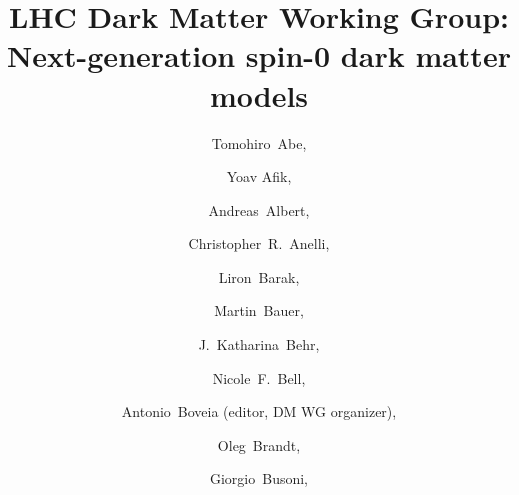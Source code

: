 \documentclass[review]{elsarticle}
\begin{document}
\title{LHC Dark Matter Working Group: Next-generation spin-0 dark matter models}


\author[1,2]{Tomohiro~Abe,}
\address[1]{Institute for Advanced Research, Nagoya University, \\
Furo-cho Chikusa-ku, Nagoya, Aichi, 464-8602, Japan}
\address[2]{Kobayashi-Maskawa Institute for the Origin of Particles and the Universe, \\
 Nagoya University, Furo-cho Chikusa-ku, Nagoya, Aichi, 464-8602, Japan}

\author[3]{Yoav Afik,} 
\address[3]{Department of Physics, Technion: Israel Institute of Technology, Haifa, Israel}

\author[4]{Andreas~Albert,}
\address[4]{III. Physikalisches Institut A, RWTH Aachen University, \\
Physikzentrum, Otto-Blumenthal-Stra{\ss}e, Aachen, Germany}

\author[5]{Christopher~R.~Anelli,}
\address[5]{University of Victoria, Department of Physics and Astronomy, \\ 
Elliott Building, room 101, University of Victoria, Victoria, Canada}

\author[6]{Liron~Barak,}
\address[6]{Tel Aviv University, Haim Levanon (Ramat Aviv), Tel Aviv 69978, Israel}

\author[7]{Martin~Bauer,}
\address[7]{Institute for Particle Physics Phenomenology, Department of Physics, \\ 
Durham University, South Road, Durham DH1 3LE, UK}

\author[8]{J.~Katharina~Behr,}
\address[8]{DESY, Notkestra{\ss}e 85, D-22607 Hamburg, Germany}

\author[9]{Nicole~F.~Bell,}
\address[9]{ARC Centre of Excellence for Particle Physics at the Terascale \\
School of Physics, The University of Melbourne, Victoria 3010, Australia}

\author[10]{Antonio~Boveia (editor, DM WG organizer),}
\address[10]{Ohio State University and Center for Cosmology and Astroparticle Physics, \\
191 W. Woodruff Avenue Columbus, OH 43210, USA}

\author[11]{Oleg~Brandt,}
\address[11]{Kirchhoff-Institut f{\"u}r Physik, Ruprecht-Karls-Universit{\"a}t Heidelberg, \\ 
Im Neuenheimer Feld 227, 69120 Heidelberg, Germany}

\author[9]{Giorgio~Busoni,}
\end{document}
